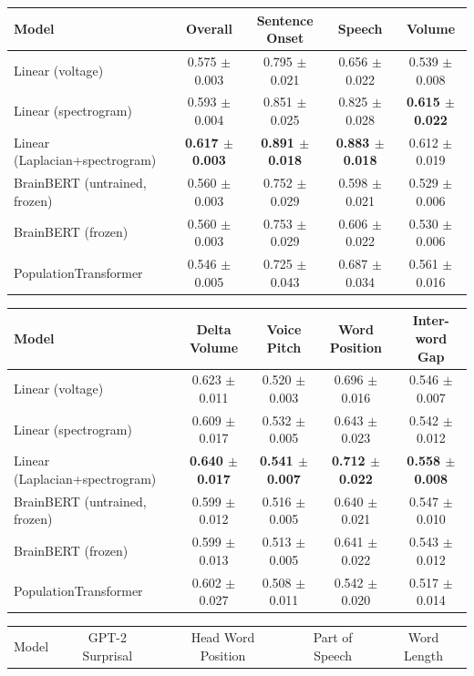 \begin{table}[h]
\centering
\begin{tabular}{lcccc}
\hline
Model & Overall & Sentence Onset & Speech & Volume \\
\hline
Linear (voltage) & 0.575 $\pm$ 0.003 & 0.795 $\pm$ 0.021 & 0.656 $\pm$ 0.022 & 0.539 $\pm$ 0.008 \\
Linear (spectrogram) & 0.593 $\pm$ 0.004 & 0.851 $\pm$ 0.025 & 0.825 $\pm$ 0.028 & \textbf{0.615 $\pm$ 0.022} \\
Linear (Laplacian+spectrogram) & \textbf{0.617 $\pm$ 0.003} & \textbf{0.891 $\pm$ 0.018} & \textbf{0.883 $\pm$ 0.018} & 0.612 $\pm$ 0.019 \\
BrainBERT (untrained, frozen) & 0.560 $\pm$ 0.003 & 0.752 $\pm$ 0.029 & 0.598 $\pm$ 0.021 & 0.529 $\pm$ 0.006 \\
BrainBERT (frozen) & 0.560 $\pm$ 0.003 & 0.753 $\pm$ 0.029 & 0.606 $\pm$ 0.022 & 0.530 $\pm$ 0.006 \\
PopulationTransformer & 0.546 $\pm$ 0.005 & 0.725 $\pm$ 0.043 & 0.687 $\pm$ 0.034 & 0.561 $\pm$ 0.016 \\
\hline
\end{tabular}
\hspace{1em}
\begin{tabular}{lcccc}
\hline
Model & Delta Volume & Voice Pitch & Word Position & Inter-word Gap \\
\hline
Linear (voltage) & 0.623 $\pm$ 0.011 & 0.520 $\pm$ 0.003 & 0.696 $\pm$ 0.016 & 0.546 $\pm$ 0.007 \\
Linear (spectrogram) & 0.609 $\pm$ 0.017 & 0.532 $\pm$ 0.005 & 0.643 $\pm$ 0.023 & 0.542 $\pm$ 0.012 \\
Linear (Laplacian+spectrogram) & \textbf{0.640 $\pm$ 0.017} & \textbf{0.541 $\pm$ 0.007} & \textbf{0.712 $\pm$ 0.022} & \textbf{0.558 $\pm$ 0.008} \\
BrainBERT (untrained, frozen) & 0.599 $\pm$ 0.012 & 0.516 $\pm$ 0.005 & 0.640 $\pm$ 0.021 & 0.547 $\pm$ 0.010 \\
BrainBERT (frozen) & 0.599 $\pm$ 0.013 & 0.513 $\pm$ 0.005 & 0.641 $\pm$ 0.022 & 0.543 $\pm$ 0.012 \\
PopulationTransformer & 0.602 $\pm$ 0.027 & 0.508 $\pm$ 0.011 & 0.542 $\pm$ 0.020 & 0.517 $\pm$ 0.014 \\
\hline
\end{tabular}
\hspace{1em}
\begin{tabular}{lcccc}
\hline
Model & GPT-2 Surprisal & Head Word Position & Part of Speech & Word Length \\

\end{tabular}
\end{table}
